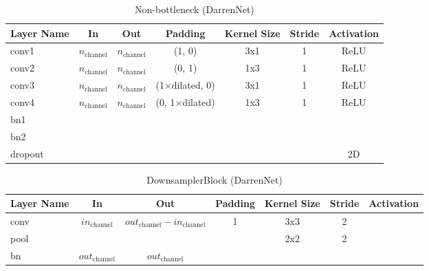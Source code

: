 \begin{table}[H]
	\setlength{\abovecaptionskip}{10pt}
	\centering
	\begin{tabular}{|l|c|c|c|c|c|c|}
		\hline
		\textbf{Layer Name} & \textbf{In}          & \textbf{Out}         & \textbf{Padding}      & \textbf{Kernel Size} & \textbf{Stride} & \textbf{Activation} \\
		\hline
		conv1               & $n_{\text{channel}}$ & $n_{\text{channel}}$ & (1, 0)                & 3x1                  & 1               & ReLU                \\
		\hline
		conv2               & $n_{\text{channel}}$ & $n_{\text{channel}}$ & (0, 1)                & 1x3                  & 1               & ReLU                \\
		\hline
		conv3               & $n_{\text{channel}}$ & $n_{\text{channel}}$ & (1$\times$dilated, 0) & 3x1                  & 1               & ReLU                \\
		\hline
		conv4               & $n_{\text{channel}}$ & $n_{\text{channel}}$ & (0, 1$\times$dilated) & 1x3                  & 1               & ReLU                \\
		\hline
		bn1                 &                      &                      &                       &                      &                 &                     \\
		\hline
		bn2                 &                      &                      &                       &                      &                 &                     \\
		\hline
		dropout             &                      &                      &                       &                      &                 & 2D                  \\
		\hline
	\end{tabular}
	\caption{Non-bottleneck (DarrenNet)}
\end{table}

\begin{table}[H]
	\setlength{\abovecaptionskip}{10pt}
	\centering
	\begin{tabular}{|l|c|c|c|c|c|c|}
		\hline
		\textbf{Layer Name} & \textbf{In}            & \textbf{Out}                                 & \textbf{Padding} & \textbf{Kernel Size} & \textbf{Stride} & \textbf{Activation} \\
		\hline
		conv                & $in_{\text{channel}}$  & $out_{\text{channel}} - in_{\text{channel}}$ & 1                & 3x3                  & 2               &                     \\
		\hline
		pool                &                        &                                              &                  & 2x2                  & 2               &                     \\
		\hline
		bn                  & $out_{\text{channel}}$ & $out_{\text{channel}}$                       &                  &                      &                 &                     \\
		\hline
	\end{tabular}
	\caption{DownsamplerBlock (DarrenNet)}
\end{table}

